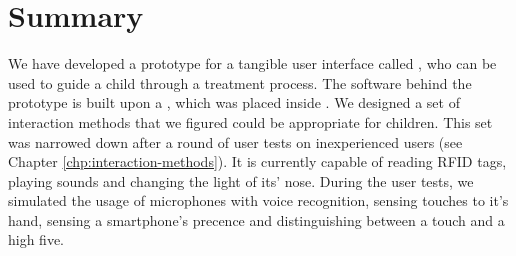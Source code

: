 \section{Summary}
\label{sec:asthmabuddysummary}
We have developed a prototype for a tangible user interface called \ab{}, who can be used to guide a child through a treatment process. The software behind the prototype is built upon a \rpi{}, which was placed inside \ab{}. We designed a set of interaction methods that we figured could be appropriate for children. This set was narrowed down after a round of user tests on inexperienced users (see Chapter \ref{chp:interaction-methods}). It is currently capable of reading RFID tags, playing sounds and changing the light of its' nose. During the user tests, we simulated the usage of microphones with voice recognition, sensing touches to it's hand, sensing a smartphone's precence and distinguishing between a touch and a high five.       